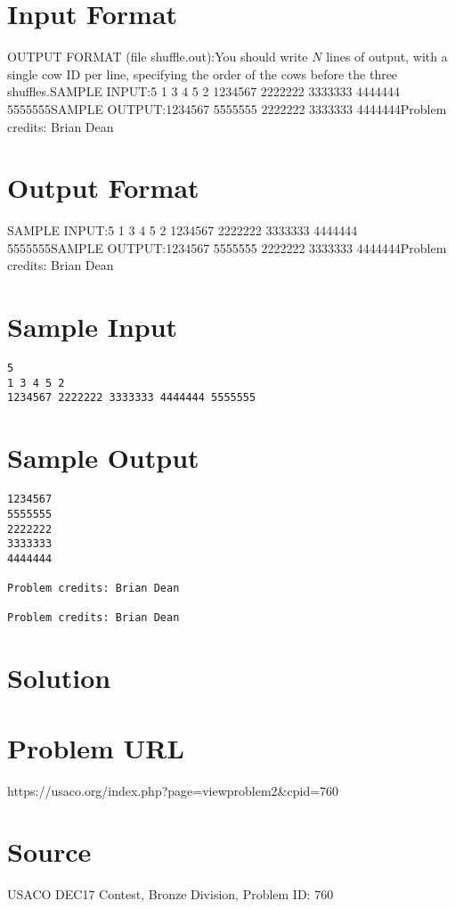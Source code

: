\documentclass[12pt]{article}
\begin{document}
\section*{Input Format}
OUTPUT FORMAT (file shuffle.out):You should write $N$ lines of output, with a single cow ID per line, specifying
the  order of the cows before the three shuffles.SAMPLE INPUT:5
1 3 4 5 2
1234567 2222222 3333333 4444444 5555555SAMPLE OUTPUT:1234567
5555555
2222222
3333333
4444444Problem credits: Brian Dean

\section*{Output Format}
SAMPLE INPUT:5
1 3 4 5 2
1234567 2222222 3333333 4444444 5555555SAMPLE OUTPUT:1234567
5555555
2222222
3333333
4444444Problem credits: Brian Dean

\section*{Sample Input}
\begin{verbatim}
5
1 3 4 5 2
1234567 2222222 3333333 4444444 5555555
\end{verbatim}

\section*{Sample Output}
\begin{verbatim}
1234567
5555555
2222222
3333333
4444444

Problem credits: Brian Dean

Problem credits: Brian Dean
\end{verbatim}

\section*{Solution}


\section*{Problem URL}
https://usaco.org/index.php?page=viewproblem2&cpid=760

\section*{Source}
USACO DEC17 Contest, Bronze Division, Problem ID: 760
\end{document}
